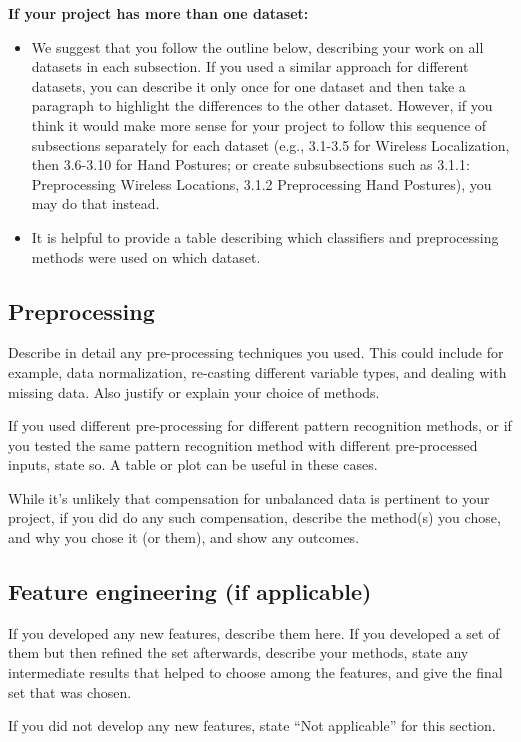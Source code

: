 \documentclass[singlecolumn]{article}
\begin{document}
\textbf{If your project has more than one dataset: }
\begin{itemize}
	\item We suggest that you follow the outline below, describing your work on all datasets in each subsection. If you used a similar approach for different datasets, you can describe it only once for one dataset and then take a paragraph to highlight the differences to the other dataset. However, if you think it would make more sense for your project to follow this sequence of subsections separately for each dataset (e.g., 3.1-3.5 for Wireless Localization, then 3.6-3.10 for Hand Postures; or create subsubsections such as 3.1.1: Preprocessing Wireless Locations, 3.1.2 Preprocessing Hand Postures), you may do that instead. 
	\item It is helpful to provide a table describing which classifiers and preprocessing methods were used on which dataset.
\end{itemize}

\subsection{Preprocessing}
Describe in detail any pre-processing techniques you used. This could include for example, data normalization, re-casting different variable types, and dealing with missing data. Also justify or explain your choice of methods. 

If you used different pre-processing for different pattern recognition methods, or if you tested the same pattern recognition method with different pre-processed inputs, state so. A table or plot can be useful in these cases. 

While it’s unlikely that compensation for unbalanced data is pertinent to your project, if you did do any such compensation, describe the method(s) you chose, and why you chose it (or them), and show any outcomes.

\subsection{Feature engineering (if applicable)}
If you developed any new features, describe them here. If you developed a set of them but then refined the set afterwards, describe your methods, state any intermediate results that helped to choose among the features, and give the final set that was chosen.  

If you did not develop any new features, state “Not applicable” for this section.
 
\end{document}
